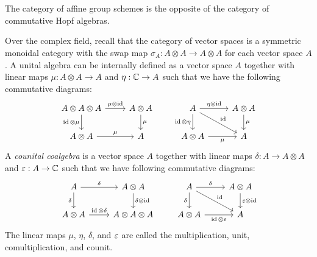 \documentclass{../../large}
\begin{document}
\chapter{}
\section{}

The category of affine group schemes is the opposite of the category of commutative Hopf algebras.

\begin{prb}
Over the complex field, recall that the category of vector spaces is a symmetric monoidal category with the swap map $\sigma_A:A\otimes A\to A\otimes A$ for each vector space $A$.
A unital algebra can be internally defined as a vector space $A$ together with linear maps $\mu:A\otimes A\to A$ and $\eta:\mathbb{C}\to A$ such that we have the following commutative diagrams:
\[\begin{tikzcd}
A\otimes A\otimes A \rar{\mu\otimes\id}\dar[swap]{\id\otimes\mu} & A\otimes A \dar{\mu} \\
A\otimes A\rar{\mu} & A
\end{tikzcd}
\qquad
\begin{tikzcd}
A \rar{\eta\otimes\id}\dar[swap]{\id\otimes\eta}\ar{dr}{\id} & A\otimes A \dar{\mu} \\
A\otimes A \rar[swap]{\mu} & A
\end{tikzcd}\]
A \emph{counital coalgebra} is a vector space $A$ together with linear maps $\delta:A\to A\otimes A$ and $\varepsilon:A\to\mathbb{C}$ such that we have following commutative diagrams:
\[\begin{tikzcd}
A \rar{\delta}\dar[swap]{\delta} & A\otimes A \dar{\delta\otimes\id} \\
A\otimes A\rar{\id\otimes\delta} & A\otimes A\otimes A
\end{tikzcd}
\qquad
\begin{tikzcd}
A \rar{\delta}\dar[swap]{\delta}\ar{dr}{\id} & A\otimes A \dar{\e\otimes\id} \\
A\otimes A \rar[swap]{\id\otimes\e} & A
\end{tikzcd}\]
The linear maps $\mu$, $\eta$, $\delta$, and $\varepsilon$ are called the multiplication, unit, comultiplication, and counit.


\end{prb}
\end{document}
